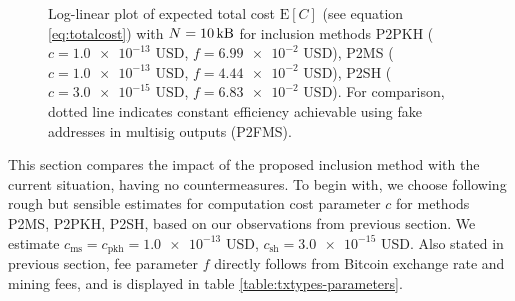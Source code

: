 \documentclass[a4paper,11pt,titlepage]{scrbook}
\begin{document}
\begin{figure}[tb]
    \centering
    \caption[Log-linear plot of expected total cost]{Log-linear plot of expected total cost $\mathrm{E}[C]$ (see equation \ref{eq:totalcost}) with $N=\protect\SI{10}{\kilo\byte}$ for inclusion methods P2PKH ($c=\num{1.0e-13}$ USD, $f=\num{6.99e-2}$ USD), P2MS ($c=\num{1.0e-13}$ USD, $f=\num{4.44e-2}$ USD), P2SH ($c=\num{3.0e-15}$ USD, $f=\num{6.83e-2}$ USD). For comparison, dotted line indicates constant efficiency achievable using fake addresses in multisig outputs (P2FMS).}
    \label{fig:plot}
\end{figure}

This section compares the impact of the proposed inclusion method with the current situation, having no countermeasures.
To begin with, we choose following rough but sensible estimates for computation cost parameter $c$ for methods P2MS, P2PKH, P2SH, based on our observations from previous section.
We estimate $c_\text{ms}=c_\text{pkh}=\num{1.0e-13}$ USD, $c_\text{sh} = \num{3.0e-15}$ USD.
Also stated in previous section, fee parameter $f$ directly follows from Bitcoin exchange rate and mining fees, and is displayed in table \ref{table:txtypes-parameters}.
\end{document}
